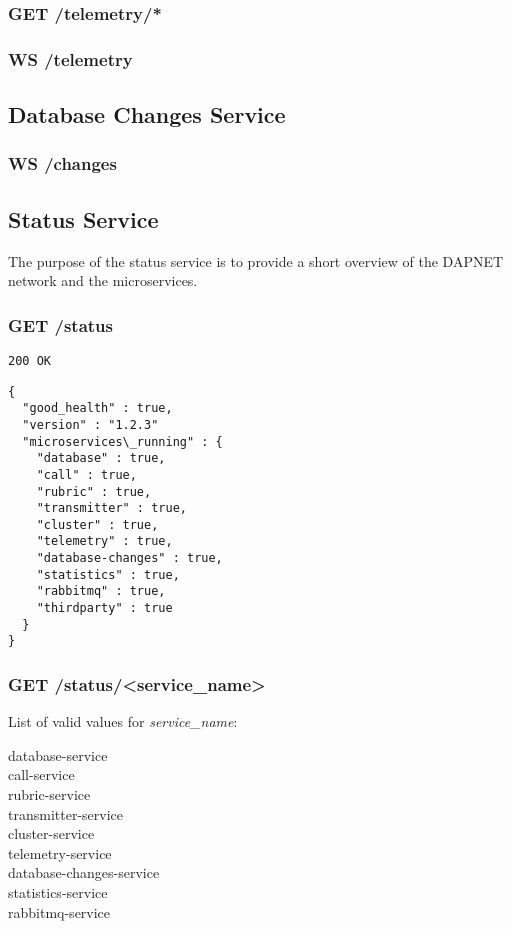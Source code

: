 \subsubsection{GET /telemetry/*}

\subsubsection{WS /telemetry}


\subsection{Database Changes Service}

\subsubsection{WS /changes}


\subsection{Status Service}
The purpose of the status service is to provide a short overview of the DAPNET network and the microservices.

\subsubsection{GET /status}
\texttt{200 OK}
\begin{lstlisting}
{
  "good_health" : true,
  "version" : "1.2.3"
  "microservices\_running" : {
    "database" : true,
    "call" : true,
    "rubric" : true,
    "transmitter" : true,
    "cluster" : true,
    "telemetry" : true,
    "database-changes" : true,
    "statistics" : true,
    "rabbitmq" : true,
    "thirdparty" : true
  }
}
\end{lstlisting}

\subsubsection{GET /status/<service\_name>}
List of valid values for \textit{service\_name}:

database-service\\
call-service\\
rubric-service\\
transmitter-service\\
cluster-service\\
telemetry-service\\
database-changes-service\\
statistics-service\\
rabbitmq-service\\


